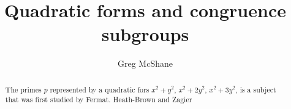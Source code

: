 
\title{Quadratic forms and  congruence subgroups}

 \author[McShane]{Greg McShane}
\address{Institut Fourier 100 rue des maths, BP 74, 38402 St Martin d'H\`eres cedex, France}




\maketitle

\begin{abstract} 
	The  primes $p$  represented by a quadratic fors 
	$x^2 + y^2$, 
	$x^2 + 2y^2$, 
	$x^2 + 3y^2$, 
	is a subject that was first  studied by Fermat. 
	Heath-Brown and Zagier 
\end{abstract} 

